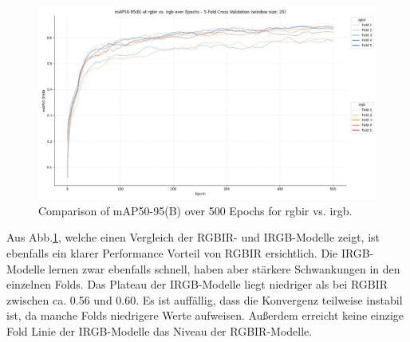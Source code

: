\begin{figure}[h] 
    \centering %
    \includegraphics[width=1\textwidth]{images/rgbir/mAP@50-95/rgbir_vs_irgb_full.png} %
    \caption{Comparison of mAP50-95(B) over 500 Epochs for rgbir vs. irgb.} %
    \label{fig:map_rgbir_irgb} %
\end{figure}
Aus Abb.\ref{fig:map_rgbir_irgb}, welche einen Vergleich der RGBIR- und IRGB-Modelle zeigt, ist ebenfalls ein klarer Performance Vorteil von RGBIR ersichtlich. Die IRGB-Modelle lernen zwar ebenfalls schnell, haben aber stärkere Schwankungen in den einzelnen Folds. Das Plateau der IRGB-Modelle liegt niedriger als bei RGBIR zwischen ca. 0.56 und 0.60. Es ist auffällig, dass die Konvergenz teilweise instabil ist, da manche Folds niedrigere Werte aufweisen. Außerdem erreicht keine einzige Fold Linie der IRGB-Modelle das Niveau der RGBIR-Modelle. 


